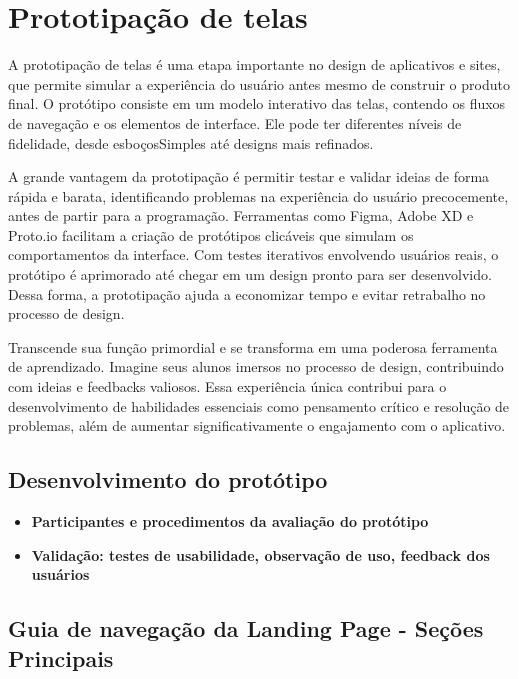 \section{Prototipação de telas}

A prototipação de telas é uma etapa importante no design de aplicativos e sites, que permite simular a experiência do usuário antes mesmo de construir o produto final. O protótipo consiste em um modelo interativo das telas, contendo os fluxos de navegação e os elementos de interface. Ele pode ter diferentes níveis de fidelidade, desde esboçosSimples até designs mais refinados. 

A grande vantagem da prototipação é permitir testar e validar ideias de forma rápida e barata, identificando problemas na experiência do usuário precocemente, antes de partir para a programação. Ferramentas como Figma, Adobe XD e Proto.io facilitam a criação de protótipos clicáveis que simulam os comportamentos da interface. Com testes iterativos envolvendo usuários reais, o protótipo é aprimorado até chegar em um design pronto para ser desenvolvido. Dessa forma, a prototipação ajuda a economizar tempo e evitar retrabalho no processo de design.

Transcende sua função primordial e se transforma em uma poderosa ferramenta de aprendizado. Imagine seus alunos imersos no processo de design, contribuindo com ideias e feedbacks valiosos. Essa experiência única contribui para o desenvolvimento de habilidades essenciais como pensamento crítico e resolução de problemas, além de aumentar significativamente o engajamento com o aplicativo.



\subsection{Desenvolvimento do protótipo}


\begin{itemize}
    \item \textbf{Participantes e procedimentos da avaliação do protótipo}
    \item \textbf{Validação: testes de usabilidade, observação de uso, feedback dos usuários}
    
\end{itemize}


\subsection{Guia de navegação da Landing Page - Seções Principais}

